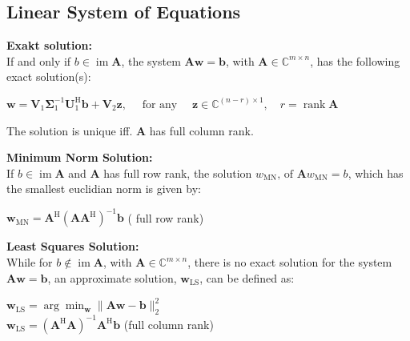 \documentclass[english]{latex4ei/latex4ei_sheet}
\begin{document}
\begin{sectionbox}
  \subsection{Linear System of Equations}
  \textbf{Exakt solution:}\\
  If and only if $b \in \operatorname{im} \boldsymbol{A}$, the system $\boldsymbol{A} \boldsymbol{w}=\boldsymbol{b}$, with $\boldsymbol{A} \in \mathbb{C}^{m \times n}$, has the following exact solution(s):
  \begin{emphbox}
    $\boldsymbol{w}=\boldsymbol{V}_{1} \boldsymbol{\Sigma}_{1}^{-1} \boldsymbol{U}_{1}^{\mathrm{H}} \boldsymbol{b}+\boldsymbol{V}_{2} \boldsymbol{z}, \quad \text { for any } \quad \boldsymbol{z} \in \mathbb{C}^{(n-r) \times 1}, \quad r=\operatorname{rank} \boldsymbol{A}$
  \end{emphbox}
  The solution is unique iff. $\boldsymbol{A}$ has full column rank.

  \textbf{Minimum Norm Solution:}\\
  If $b \in \operatorname{im} \boldsymbol{A}$ and $\boldsymbol{A}$ has full row rank, the solution $w_{\mathrm{MN}} \text {, of } \boldsymbol{A} w_{\mathrm{MN}}=b$, which has the smallest euclidian norm is given by:
  \begin{emphbox}
    $\boldsymbol{w}_{\mathrm{MN}}=\boldsymbol{A}^{\mathrm{H}}\left(\boldsymbol{A} \boldsymbol{A}^{\mathrm{H}}\right)^{-1} \boldsymbol{b}$ ( full row rank)\\
  \end{emphbox}

  \textbf{Least Squares Solution:}\\
  While for $b \notin \operatorname{im} \boldsymbol{A}$, with $\boldsymbol{A} \in \mathbb{C}^{m \times n}$, there is no exact solution for the system $\boldsymbol{A} \boldsymbol{w}=\boldsymbol{b}$, an approximate solution, $\boldsymbol{w}_{\mathrm{LS}}$, can be defined as:
  \begin{emphbox}
    $\boldsymbol{w}_{\mathrm{LS}}=\arg \min _{\boldsymbol{w}}\|\boldsymbol{A} \boldsymbol{w}-\boldsymbol{b}\|_{2}^{2}$\\
    $\boldsymbol{w}_{\mathrm{LS}}=\left(\boldsymbol{A}^{\mathrm{H}} \boldsymbol{A}\right)^{-1} \boldsymbol{A}^{\mathrm{H}} \boldsymbol{b}$ (full column rank)
  \end{emphbox}
\end{sectionbox}
\end{document}
